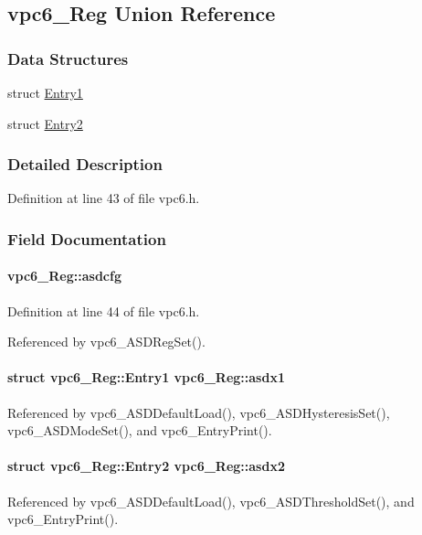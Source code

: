 \subsection{vpc6\_\-Reg Union Reference}
\label{unionvpc6__Reg}
\subsubsection*{Data Structures}
\begin{DoxyCompactItemize}
\item 
struct \hyperlink{structvpc6__Reg_1_1Entry1}{Entry1}
\item 
struct \hyperlink{structvpc6__Reg_1_1Entry2}{Entry2}
\end{DoxyCompactItemize}


\subsubsection{Detailed Description}


Definition at line 43 of file vpc6.h.

\subsubsection{Field Documentation}
\paragraph[{asdcfg}]{ {\bf vpc6\_\-Reg::asdcfg}}\hfill\label{unionvpc6__Reg_a44e0924a9a4dc1e9ca14f2a95a2f886f}


Definition at line 44 of file vpc6.h.

Referenced by vpc6\_\-ASDRegSet().
\paragraph[{asdx1}]{\setlength{\rightskip}{0pt plus 5cm}struct {\bf vpc6\_\-Reg::Entry1}  {\bf vpc6\_\-Reg::asdx1}}\hfill\label{unionvpc6__Reg_ac2872b7f3ac727764d3bca29940a0c62}


Referenced by vpc6\_\-ASDDefaultLoad(), vpc6\_\-ASDHysteresisSet(), vpc6\_\-ASDModeSet(), and vpc6\_\-EntryPrint().
\paragraph[{asdx2}]{\setlength{\rightskip}{0pt plus 5cm}struct {\bf vpc6\_\-Reg::Entry2}  {\bf vpc6\_\-Reg::asdx2}}\hfill\label{unionvpc6__Reg_aa3a2c77cee8b1223554adb532114a178}


Referenced by vpc6\_\-ASDDefaultLoad(), vpc6\_\-ASDThresholdSet(), and vpc6\_\-EntryPrint().